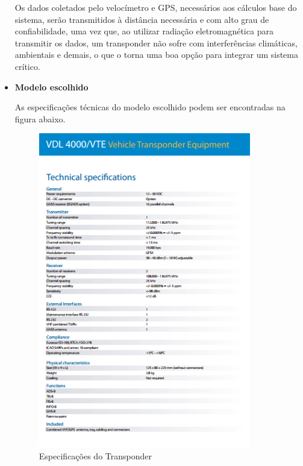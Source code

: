 \begin{itemize}
Os dados coletados pelo velocímetro e GPS, necessários aos cálculos base do sistema, serão transmitidos à distância necessária e com alto grau de confiabilidade, uma vez que, ao utilizar radiação eletromagnética para transmitir os dados, um transponder não sofre com interferências climáticas, ambientais e demais, o que o torna uma boa opção para integrar um sistema crítico.

\item \textbf{Modelo escolhido}

As especificações técnicas do modelo escolhido podem ser encontradas na figura abaixo.

\begin{figure}[h]
  \centering
  \includegraphics[width=350px, scale=1]{figuras/transponder_settings}
  \caption{Especificações do Transponder}
\label{fig:transponder_settings}
\end{figure}

\end{itemize}